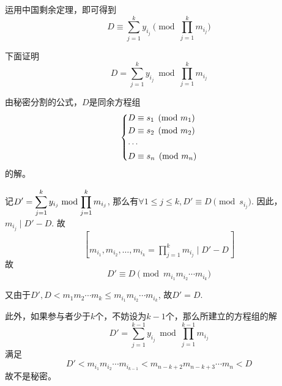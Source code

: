 运用中国剩余定理，即可得到
\begin{equation}
D\equiv\sum_{j=1}^ky_{i_j}\pmod{\prod_{j=1}^km_{i_j}}
\end{equation}

下面证明
\[D=\sum_{j=1}^ky_{i_j}\bmod{\prod_{j=1}^km_{i_j}}\]

由秘密分割的公式，$D$是同余方程组
\begin{equation}
\begin{dcases}
D\equiv s_{1}\pmod{m_{1}}\\
D\equiv s_{2}\pmod{m_{2}}\\
\cdots\\
D\equiv s_{n}\pmod{m_{n}}
\end{dcases}
\end{equation}
的解。\par
记$\displaystyle D'=\sum_{j=1}^ky_{i_j}\bmod{\prod_{j=1}^km_{i_j}}$, 那么有$\forall 1\leq j\leq k, D'\equiv D\pmod{s_{i_j}}$. 因此，$m_{i_j}\mid D'-D$. 故
\[\brack{m_{i_1}, m_{i_2}, \ldots, m_{i_k}}=\prod_{j=1}^km_{i_j}\mid D'-D\]
故
\[D'\equiv D\pmod{m_{i_1}m_{i_2}\cdots m_{i_k}}\]

又由于$D', D<m_1m_2\cdots m_k\leq m_{i_1}m_{i_2}\cdots m_{i_k}$, 故$D'=D$.\par
此外，如果参与者少于$k$个，不妨设为$k-1$个，那么所建立的方程组的解
\[D'=\sum_{j=1}^{k-1}y_{i_j}\bmod{\prod_{j=1}^{k-1}m_{i_j}}\]
满足
\[D'<m_{i_1}m_{i_2}\cdots m_{i_{k-1}}<m_{n-k+2}m_{n-k+3}\cdots m_n<D\]
故不是秘密。